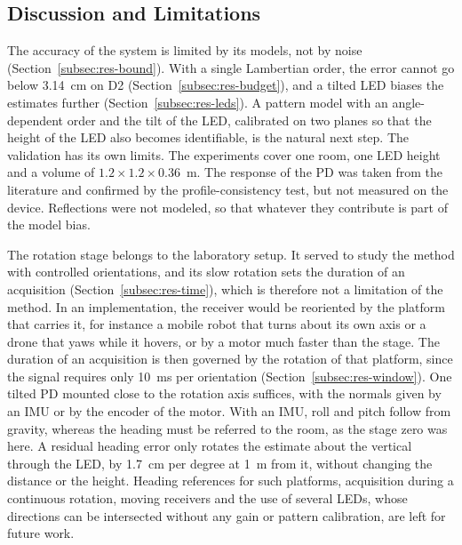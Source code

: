 \subsection{Discussion and Limitations}
\label{subsec:discussion}
The accuracy of the system is limited by its models, not by noise (Section~\ref{subsec:res-bound}). With a single Lambertian order, the error cannot go below 3.14~cm on D2 (Section~\ref{subsec:res-budget}), and a tilted LED biases the estimates further (Section~\ref{subsec:res-leds}). A pattern model with an angle-dependent order and the tilt of the LED, calibrated on two planes so that the height of the LED also becomes identifiable, is the natural next step. The validation has its own limits. The experiments cover one room, one LED height and a volume of $1.2\times1.2\times0.36$~m. The response of the PD was taken from the literature and confirmed by the profile-consistency test, but not measured on the device. Reflections were not modeled, so that whatever they contribute is part of the model bias.

The rotation stage belongs to the laboratory setup. It served to study the method with controlled orientations, and its slow rotation sets the duration of an acquisition (Section~\ref{subsec:res-time}), which is therefore not a limitation of the method. In an implementation, the receiver would be reoriented by the platform that carries it, for instance a mobile robot that turns about its own axis or a drone that yaws while it hovers, or by a motor much faster than the stage. The duration of an acquisition is then governed by the rotation of that platform, since the signal requires only 10~ms per orientation (Section~\ref{subsec:res-window}). One tilted PD mounted close to the rotation axis suffices, with the normals given by an IMU or by the encoder of the motor. With an IMU, roll and pitch follow from gravity, whereas the heading must be referred to the room, as the stage zero was here. A residual heading error only rotates the estimate about the vertical through the LED, by 1.7~cm per degree at 1~m from it, without changing the distance or the height. Heading references for such platforms, acquisition during a continuous rotation, moving receivers and the use of several LEDs, whose directions can be intersected without any gain or pattern calibration, are left for future work.
